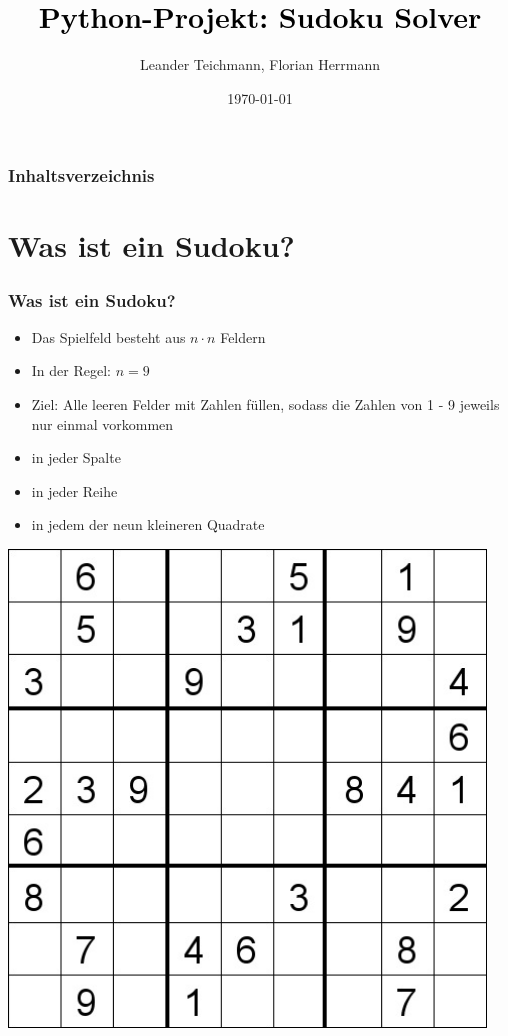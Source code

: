 \documentclass{beamer}
\begin{document}
\title{\textcolor{black}{Python-Projekt: Sudoku Solver}}   
\author{Leander Teichmann, Florian Herrmann} 
\date{\today}

\begin{frame}
\titlepage
\end{frame}


\begin{frame}
\frametitle{Inhaltsverzeichnis}\tableofcontents
\end{frame}

\section{Was ist ein Sudoku?}
\begin{frame}
	\frametitle{Was ist ein Sudoku?} 
	\begin{minipage}{0.48\textwidth}
	\begin{itemize}
		\item Das Spielfeld besteht aus $n \cdot n$ Feldern
		\item In der Regel: $n = 9$
		\item Ziel: Alle leeren Felder mit Zahlen füllen, sodass die Zahlen von 1 - 9 jeweils nur einmal vorkommen 
		\item in jeder Spalte 
		\item in jeder Reihe 
		\item in jedem der neun kleineren Quadrate
	\end{itemize} 
	\end{minipage}
	\begin{minipage}{0.48\textwidth}
		\centering
		\includegraphics[width=0.95\textwidth]{img/sudoku.jpg}
	\end{minipage}
\end{frame}
\end{document}
